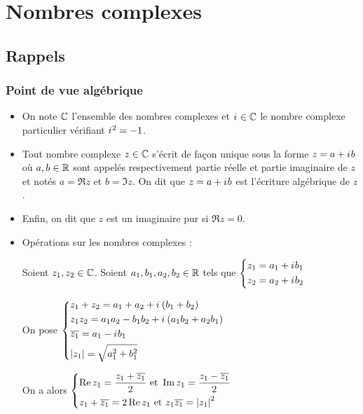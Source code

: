 \chapter{Nombres complexes}

\minitoc

\section{Rappels}

\subsection{Point de vue algébrique}

\begin{rappel}
\begin{itemize}
\item On note \(\mathbb{C}\) l'ensemble des nombres complexes et \(i\mkern1mu\in\mathbb{C}\) le nombre complexe particulier vérifiant \(i\mkern1mu^2=-1\).

\item Tout nombre complexe \(z\in\mathbb{C}\) s'écrit de façon unique sous la forme \(z=a+i\mkern1mu b\) où \(a,b\in\mathbb{R}\) sont appelés respectivement partie réelle et partie imaginaire de \(z\) et notés \(a=\Re z\) et \(b=\Im z\). On dit que \(z=a+i\mkern1mu b\) est l'écriture algébrique de \(z\).

\item Enfin, on dit que \(z\) est un imaginaire pur si \(\Re z=0\).

\item Opérations sur les nombres complexes :

Soient \(z_1,z_2\in\mathbb{C}\). Soient \(a_1,b_1,a_2,b_2\in\mathbb{R}\) tels que \(\begin{dcases}z_1=a_1+i\mkern1mu b_1 \\ z_2=a_2+i\mkern1mu b_2\end{dcases}\)

On pose \(\begin{dcases}z_1+z_2=a_1+a_2+i\mkern1mu\left(b_1+b_2\right) \\ z_1z_2=a_1a_2-b_1b_2+i\mkern1mu\left(a_1b_2+a_2b_1\right) \\ \overline{z_1}=a_1-i\mkern1mu b_1 \\ \left\lvert z_1\right\rvert=\sqrt{a_1^2+b_1^2}\end{dcases}\)

On a alors \(\begin{dcases}\operatorname{Re} z_1=\dfrac{z_1+\overline{z_1}}{2}\text{ et }\operatorname{Im} z_1=\dfrac{z_1-\overline{z_1}}{2} \\ z_1+\overline{z_1}=2\operatorname{Re} z_1\text{ et }z_1\overline{z_1}=\left\lvert z_1\right\rvert^2\end{dcases}\)


\end{itemize}
\end{rappel}
